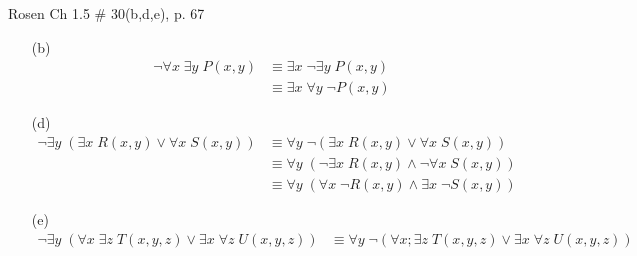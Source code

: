 \documentclass[12pt,addpoints]{exam}
\begin{document}
\begin{questions}
\question[6] Rosen Ch 1.5 \# 30(b,d,e), p. 67
    \ifprintanswers
        \vspace{-10pt}
    \fi
\begin{solution}
    \begin{itemize}[itemsep=0pt,parsep=0pt,topsep=0pt,partopsep=0pt]
        \item[(b)]
        \begin{align*}
          \neg \forall x\; \exists y\; P(x,y) & \equiv \exists x\; \neg \exists y\; P(x,y) \\
          & \equiv \exists x\; \forall y\; \neg P(x,y)
        \end{align*}
        \item[(d)]
        \begin{align*}
          \neg \exists y\; (\exists x\; R(x,y) \vee \forall x\; S(x,y)) & \equiv \forall y\; \neg (\exists x\; R(x,y) \vee \forall x\; S(x,y)) \\
          & \equiv \forall y\; (\neg \exists x\; R(x,y) \wedge \neg \forall x\; S(x,y)) \\
          & \equiv \forall y\; (\forall x\; \neg R(x,y) \wedge \exists x\; \neg S(x,y))
        \end{align*}
        \item[(e)] \small
        \vspace{-15pt}
        \begin{align*}
          \neg \exists y\; (\forall x\; \exists z\; T(x,y,z) \vee \exists x\; \forall z\; U(x,y,z)) & \equiv \forall y\; \neg (\forall x; \exists z\; T(x,y,z) \vee \exists x\; \forall z\; U(x,y,z)) \\

\end{align*}
\end{itemize}
\end{solution}
\end{questions}
\end{document}
